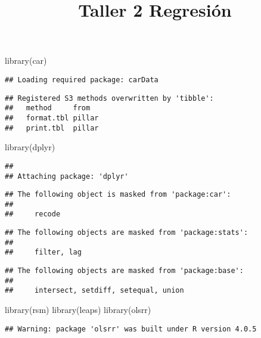 \documentclass[
]{article}
\title{Taller 2 Regresión}
\author{}
\date{\vspace{-2.5em}}
\newenvironment{Shaded}{\begin{snugshade}}{\end{snugshade}}
\newcommand{\FunctionTok}[1]{\textcolor[rgb]{0.00,0.00,0.00}{#1}}
\newcommand{\NormalTok}[1]{#1}
\begin{document}
\maketitle

\begin{Shaded}
\begin{Highlighting}[]
\FunctionTok{library}\NormalTok{(car)}
\end{Highlighting}
\end{Shaded}

\begin{verbatim}
## Loading required package: carData
\end{verbatim}

\begin{verbatim}
## Registered S3 methods overwritten by 'tibble':
##   method     from  
##   format.tbl pillar
##   print.tbl  pillar
\end{verbatim}

\begin{Shaded}
\begin{Highlighting}[]
\FunctionTok{library}\NormalTok{(dplyr)}
\end{Highlighting}
\end{Shaded}

\begin{verbatim}
## 
## Attaching package: 'dplyr'
\end{verbatim}

\begin{verbatim}
## The following object is masked from 'package:car':
## 
##     recode
\end{verbatim}

\begin{verbatim}
## The following objects are masked from 'package:stats':
## 
##     filter, lag
\end{verbatim}

\begin{verbatim}
## The following objects are masked from 'package:base':
## 
##     intersect, setdiff, setequal, union
\end{verbatim}

\begin{Shaded}
\begin{Highlighting}[]
\FunctionTok{library}\NormalTok{(rsm)}
\FunctionTok{library}\NormalTok{(leaps)}
\FunctionTok{library}\NormalTok{(olsrr)}
\end{Highlighting}
\end{Shaded}

\begin{verbatim}
## Warning: package 'olsrr' was built under R version 4.0.5
\end{verbatim}
\end{document}
